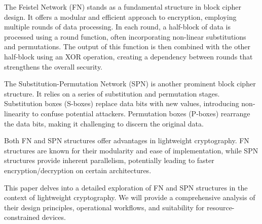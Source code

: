 \documentclass[conference]{IEEEtran}
\begin{document}
The Feistel Network (FN) stands as a fundamental structure in block cipher design. It offers a modular and efficient approach to encryption, employing multiple rounds of data processing. In each round, a half-block of data is processed using a round function, often incorporating non-linear substitutions and permutations. The output of this function is then combined with the other half-block using an XOR operation, creating a dependency between rounds that strengthens the overall security.\cite{FEISTEL}

The Substitution-Permutation Network (SPN) is another prominent block cipher structure. It relies on a series of substitution and permutation stages. Substitution boxes (S-boxes) replace data bits with new values, introducing non-linearity to confuse potential attackers. Permutation boxes (P-boxes) rearrange the data bits, making it challenging to discern the original data.\cite{heys1996substitution}

Both FN and SPN structures offer advantages in lightweight cryptography. FN structures are known for their modularity and ease of implementation, while SPN structures provide inherent parallelism, potentially leading to faster encryption/decryption on certain architectures.

This paper delves into a detailed exploration of FN and SPN structures in the context of lightweight cryptography. We will provide a comprehensive analysis of their design principles, operational workflows, and suitability for resource-constrained devices.
\end{document}
